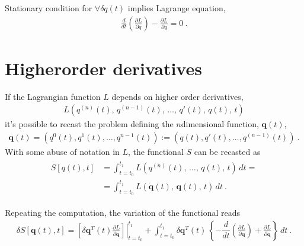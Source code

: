\documentclass[letterpaper,10pt,english]{jupyterBook}
\begin{document}
\sphinxAtStartPar
{} Stationary condition for \(\forall \delta q(t)\) implies Lagrange equation,
\begin{equation*}
\begin{split}\frac{d}{dt}\left( \frac{\partial L}{\partial \dot{q}} \right) - \frac{\partial L}{\partial q} = 0 \ .\end{split}
\end{equation*}

\section{Higher\sphinxhyphen{}order derivatives}
\label{\detokenize{ch/calculus-variations/intro:higher-order-derivatives}}
\sphinxAtStartPar
{} If the Lagrangian function \(L\) depends on higher order derivatives,
\begin{equation*}
\begin{split}L \left(q^{(n)}(t), \, q^{(n-1)}(t), \, \dots, \, q'(t), \, q(t), \, t \right)\end{split}
\end{equation*}
\sphinxAtStartPar
it’s possible to recast the problem defining the \(n\)\sphinxhyphen{}dimensional function, \(\mathbf{q}(t)\),
\begin{equation*}
\begin{split}\mathbf{q}(t) = \left( q^0(t), q^1(t), \dots, q^{n-1}(t) \right) := \left(q(t), q'(t), \dots, q^{(n-1)}(t) \right) \ .\end{split}
\end{equation*}
\sphinxAtStartPar
With some abuse of notation in \(L\), the functional \(S\) can be recasted as
\begin{equation*}
\begin{split}\begin{aligned}
  S[q(t),t] 
  & = \int_{t=t_0}^{t_1} L(q^{(n)}(t), \, \dots, \, q(t), \, t) \, dt = \\
  & = \int_{t=t_0}^{t_1} L(\dot{\mathbf{q}}(t), \, \mathbf{q}(t), \, t) \, dt \ .
\end{aligned}\end{split}
\end{equation*}
\sphinxAtStartPar
{} 

\sphinxAtStartPar
Repeating the computation, the variation of the functional reads
\begin{equation*}
\begin{split}\delta S[\mathbf{q}(t), t] = \left.\left[ \delta \mathbf{q}^T(t) \frac{\partial L}{\partial \dot{\mathbf{q}}} \right]\right|_{t=t_0}^{t_1} + \int_{t = t_0}^{t_1} \delta \mathbf{q}^T(t) \, \left\{ - \dfrac{d}{dt} \left( \frac{\partial L}{\partial \dot{\mathbf{q}}} \right) + \frac{\partial L}{\partial \mathbf{q}} \right\} \, dt \ .\end{split}
\end{equation*}
\sphinxAtStartPar
{}
\end{document}
